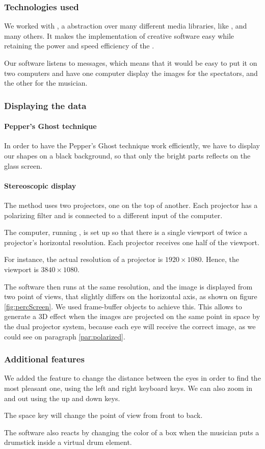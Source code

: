\subsubsection{Technologies used}
We worked with , a  abstraction over many different media libraries, like ,  and many others. It makes the implementation of creative software easy while retaining the power and speed efficiency of the .

Our software listens to  messages, which means that it would be easy to put it on two computers and have one computer display the images for the spectators, and the other for the musician.

\subsubsection{Displaying the data}
\paragraph{Pepper's Ghost technique}
In order to have the Pepper's Ghost technique work efficiently, we have to display our shapes on a black background, so that only the bright parts reflects on the glass screen.

\paragraph{Stereoscopic display}
The method uses two projectors, one on the top of another.
Each projector has a polarizing filter and is connected to a different input of the computer.

The computer, running , is set up so that there is a single viewport of twice a projector's horizontal resolution. Each projector receives one half of the viewport.

For instance, the actual resolution of a projector is $1920 \times 1080$. Hence, the viewport is $3840 \times 1080$.

The software then runs at the same resolution, and the image is displayed from two point of views, that slightly differs on the horizontal axis, as shown on figure \ref{fig:percScreen}. We used frame-buffer objects to achieve this. This allows to generate a 3D effect when the images are projected on the same point in space by the dual projector system, because each eye will receive the correct image, as we could see on paragraph \ref{par:polarized}.

\subsubsection{Additional features}
We added the feature to change the distance between the eyes in order to find the most pleasant one, using the left and right keyboard keys.
We can also zoom in and out using the up and down keys.

The space key will change the point of view from front to back.

The software also reacts by changing the color of a box when the musician puts a drumstick inside a virtual drum element.

